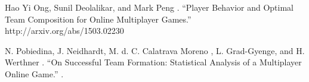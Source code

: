 \documentclass[11pt,letterpaper]{article}
\begin{document}
\begin{thebibliography}{}

Hao Yi Ong, Sunil Deolalikar, and Mark Peng
.
\newblock ``Player Behavior and Optimal Team Composition for Online Multiplayer Games.''
\newblock http://arxiv.org/abs/1503.02230

N. Pobiedina, J. Neidhardt, M. d. C. Calatrava Moreno , L. Grad-Gyenge, and H. Werthner
.
\newblock ``On Successful Team Formation: Statistical Analysis of a Multiplayer Online Game.''
.

\end{thebibliography}
\end{document}
